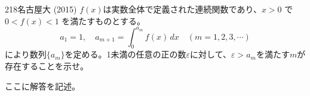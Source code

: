 \begin{prob}{218}{}{名古屋大 (2015)}
 $f(x)$は実数全体で定義された連続関数であり、$x>0$ で $0<f(x)<1$ を満たすものとする。
 \[ a_1=1,\quad a_{m+1}=\int_0^{a_m}\! f(x) \,dx \quad (m=1, 2, 3, \cdots) \]
 により数列$\{a_m\}$を定める。1未満の任意の正の数$\varepsilon$に対して、$\varepsilon>a_m$を満たす$m$が存在することを示せ。
\end{prob}
ここに解答を記述。